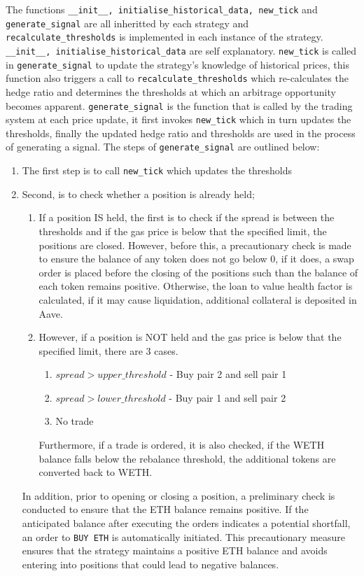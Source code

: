 The functions \texttt{\_\_init\_\_,\ initialise\_historical\_data,\ new\_tick} and \texttt{generate\_signal} are all inheritted by each strategy and \texttt{recalculate\_thresholds} is implemented in each instance of the strategy. \texttt{\_\_init\_\_,\ initialise\_historical\_data} are self explanatory. \texttt{new\_tick} is called in \texttt{generate\_signal} to update the strategy's knowledge of historical prices, this function also triggers a call to \texttt{recalculate\_thresholds} which re-calculates the hedge ratio and determines the thresholds at which an arbitrage opportunity becomes apparent. \texttt{generate\_signal} is the function that is called by the trading system at each price update, it first invokes \texttt{new\_tick} which in turn updates the thresholds, finally the updated hedge ratio and thresholds are used in the process of generating a signal. The steps of \texttt{generate\_signal} are outlined below:
\begin{enumerate}
    \item The first step is to call \texttt{new\_tick} which updates the thresholds
    \item Second, is to check whether a position is already held;
    \begin{enumerate}
        \item If a position IS held, the first is to check if the spread is between the thresholds and if the gas price is below that the specified limit, the positions are closed. However, before this, a precautionary check is made to ensure the balance of any token does not go below 0, if it does, a swap order is placed before the closing of the positions such than the balance of each token remains positive. Otherwise, the loan to value health factor is calculated, if it may cause liquidation, additional collateral is deposited in Aave.
        \item However, if a position is NOT held and the gas price is below that the specified limit, there are 3 cases. \begin{enumerate}
            \item $spread > upper\_threshold$ - Buy pair 2 and sell pair 1
            \item $spread > lower\_threshold$ - Buy pair 1 and sell pair 2
            \item No trade
        \end{enumerate}
        Furthermore, if a trade is ordered, it is also checked, if the WETH balance falls below the rebalance threshold, the additional tokens are converted back to WETH.
    \end{enumerate}
    In addition, prior to opening or closing a position, a preliminary check is conducted to ensure that the ETH balance remains positive. If the anticipated balance after executing the orders indicates a potential shortfall, an order to \texttt{BUY\ ETH} is automatically initiated. This precautionary measure ensures that the strategy maintains a positive ETH balance and avoids entering into positions that could lead to negative balances.
\end{enumerate}

